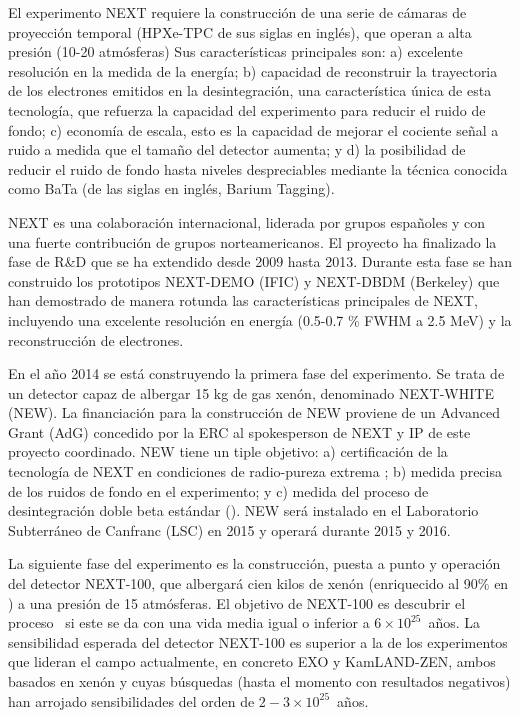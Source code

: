 \documentclass[a4paper,11pt,oneside]{article}
\begin{document}
El experimento NEXT requiere la construcción de una serie de cámaras de proyección temporal (HPXe-TPC de sus siglas en inglés), que operan a alta presión (10-20 atmósferas) 
Sus características principales son: a) excelente resolución en la medida de la energía; b) capacidad de reconstruir la trayectoria de los electrones emitidos en la desintegración, una característica única de esta tecnología, que refuerza la capacidad del experimento para reducir el ruido de fondo; c) economía de escala, esto es la capacidad de mejorar el cociente señal a ruido a medida que el tamaño del detector aumenta; y d) la posibilidad de reducir el ruido de fondo hasta niveles despreciables mediante la técnica conocida como {\sc BaTa} (de las siglas en inglés, Barium Tagging).

NEXT es  una colaboración internacional, liderada por grupos españoles y con una fuerte contribución de grupos norteamericanos. El proyecto ha finalizado la fase de R\&D que se ha extendido desde 2009 hasta 2013. Durante esta fase se han construido los prototipos NEXT-DEMO (IFIC) y NEXT-DBDM (Berkeley) que han demostrado de manera rotunda las características principales de NEXT, incluyendo una excelente resolución en energía (0.5-0.7 \% FWHM a 2.5 MeV) y la reconstrucción de electrones. 

En el año 2014 se está construyendo la primera fase del experimento. Se trata de un detector capaz de albergar 15 kg de gas xenón, denominado NEXT-WHITE (NEW). La financiación para la construcción de NEW proviene de un Advanced Grant (AdG) concedido por la ERC al spokesperson de NEXT y IP de este proyecto coordinado. NEW tiene un tiple objetivo: a) certificación de la tecnología de NEXT en condiciones de radio-pureza extrema ; b) medida precisa de los ruidos de fondo en el experimento; y c) medida del proceso de desintegración doble beta estándar (\bbtnu). NEW será instalado en el Laboratorio Subterráneo de Canfranc (LSC) en 2015 y operará durante 2015 y 2016.

La siguiente fase del experimento es la construcción, puesta a punto y operación del detector NEXT-100, que albergará cien kilos de xenón (enriquecido al 90\% en \XE) a una presión de 15 atmósferas. El objetivo de NEXT-100 es descubrir el proceso \bbonu\ si este se da con una vida media igual o inferior a $6 \times 10^{25}$~años. La sensibilidad esperada del detector NEXT-100 es superior a la de los experimentos que lideran el campo actualmente, en concreto EXO y KamLAND-ZEN, ambos basados en xenón y cuyas búsquedas (hasta el momento con resultados negativos) han arrojado sensibilidades del orden de  $2-3 \times 10^{25}$~años.
\end{document}
